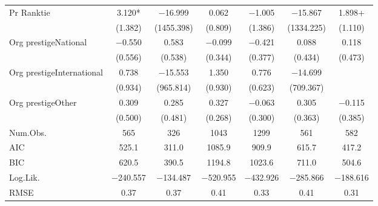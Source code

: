 \begin{table}
\begin{tabular}[t]{lcccccc}
Pr Ranktie & \num{3.120}* & \num{-16.999} & \num{0.062} & \num{-1.005} & \num{-15.867} & \num{1.898}+\\
 & (\num{1.382}) & (\num{1455.398}) & (\num{0.809}) & (\num{1.386}) & (\num{1334.225}) & (\num{1.110})\\
Org prestigeNational & \num{-0.550} & \num{0.583} & \num{-0.099} & \num{-0.421} & \num{0.088} & \num{0.118}\\
 & (\num{0.556}) & (\num{0.538}) & (\num{0.344}) & (\num{0.377}) & (\num{0.434}) & (\num{0.473})\\
Org prestigeInternational & \num{0.738} & \num{-15.553} & \num{1.350} & \num{0.776} & \num{-14.699} & \\
 & (\num{0.934}) & (\num{965.814}) & (\num{0.930}) & (\num{0.623}) & (\num{709.367}) & \\
Org prestigeOther & \num{0.309} & \num{0.285} & \num{0.327} & \num{-0.063} & \num{0.305} & \num{-0.115}\\
 & (\num{0.500}) & (\num{0.481}) & (\num{0.268}) & (\num{0.300}) & (\num{0.363}) & (\num{0.385})\\
\midrule
Num.Obs. & \num{565} & \num{326} & \num{1043} & \num{1299} & \num{561} & \num{582}\\
AIC & \num{525.1} & \num{311.0} & \num{1085.9} & \num{909.9} & \num{615.7} & \num{417.2}\\
BIC & \num{620.5} & \num{390.5} & \num{1194.8} & \num{1023.6} & \num{711.0} & \num{504.6}\\
Log.Lik. & \num{-240.557} & \num{-134.487} & \num{-520.955} & \num{-432.926} & \num{-285.866} & \num{-188.616}\\
RMSE & \num{0.37} & \num{0.37} & \num{0.41} & \num{0.33} & \num{0.41} & \num{0.31}\\
\bottomrule
\end{tabular}
\end{table}
